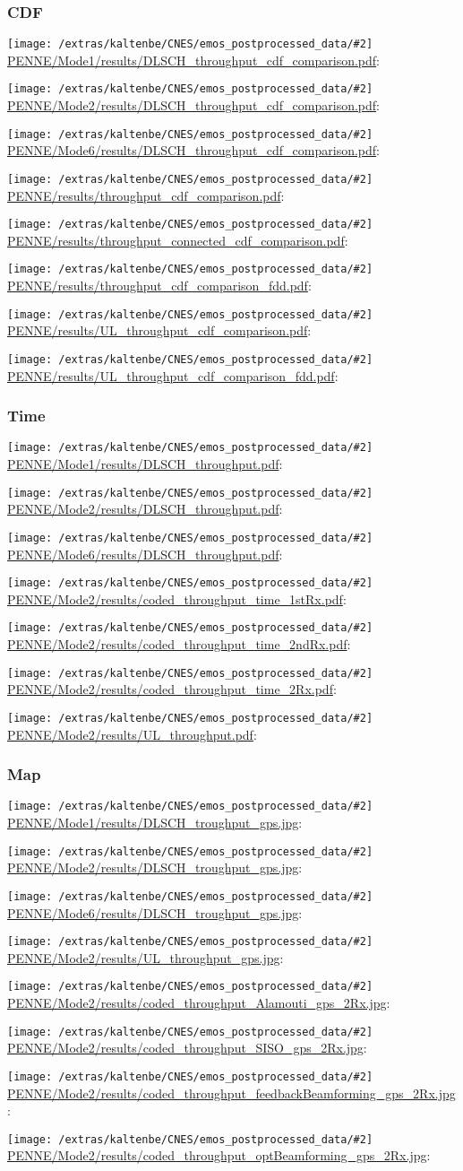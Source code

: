 \documentclass[a4paper,10pt]{article}
\newcommand{\printfile}[2][]{
 \begin{minipage}{8cm}
  \centering
  \texttt{[image: /extras/kaltenbe/CNES/emos\_postprocessed\_data/\#2]}
  \url{#2}: #1

 \end{minipage}
}
\begin{document}
\subsubsection{CDF}

\printfile{PENNE/Mode1/results/DLSCH_throughput_cdf_comparison.pdf}
\printfile{PENNE/Mode2/results/DLSCH_throughput_cdf_comparison.pdf}

\printfile{PENNE/Mode6/results/DLSCH_throughput_cdf_comparison.pdf}

\printfile{PENNE/results/throughput_cdf_comparison.pdf}
\printfile{PENNE/results/throughput_connected_cdf_comparison.pdf}

\printfile{PENNE/results/throughput_cdf_comparison_fdd.pdf}

\printfile{PENNE/results/UL_throughput_cdf_comparison.pdf}
\printfile{PENNE/results/UL_throughput_cdf_comparison_fdd.pdf}

\subsubsection{Time}

\printfile{PENNE/Mode1/results/DLSCH_throughput.pdf}
\printfile{PENNE/Mode2/results/DLSCH_throughput.pdf}

\printfile{PENNE/Mode6/results/DLSCH_throughput.pdf}
\printfile{PENNE/Mode2/results/coded_throughput_time_1stRx.pdf}

\printfile{PENNE/Mode2/results/coded_throughput_time_2ndRx.pdf}
\printfile{PENNE/Mode2/results/coded_throughput_time_2Rx.pdf}

\printfile{PENNE/Mode2/results/UL_throughput.pdf}


\subsubsection{Map}

\printfile{PENNE/Mode1/results/DLSCH_troughput_gps.jpg}
\printfile{PENNE/Mode2/results/DLSCH_troughput_gps.jpg}

\printfile{PENNE/Mode6/results/DLSCH_troughput_gps.jpg}
\printfile{PENNE/Mode2/results/UL_throughput_gps.jpg}

\printfile{PENNE/Mode2/results/coded_throughput_Alamouti_gps_2Rx.jpg}
\printfile{PENNE/Mode2/results/coded_throughput_SISO_gps_2Rx.jpg}

\printfile{PENNE/Mode2/results/coded_throughput_feedbackBeamforming_gps_2Rx.jpg}
\printfile{PENNE/Mode2/results/coded_throughput_optBeamforming_gps_2Rx.jpg}
\end{document}
